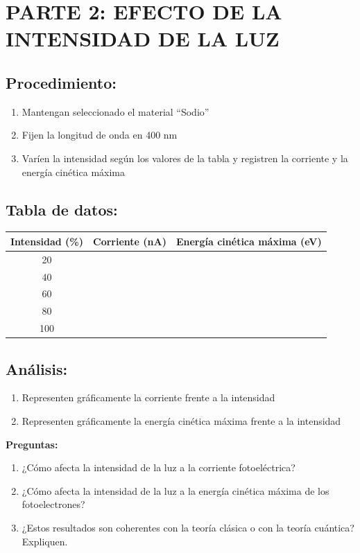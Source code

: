 \documentclass[12pt,a4paper]{article}
\begin{document}
	\section{PARTE 2: EFECTO DE LA INTENSIDAD DE LA LUZ}
	
	\subsection{Procedimiento:}
	\begin{enumerate}
		\item Mantengan seleccionado el material ``Sodio''
		\item Fijen la longitud de onda en 400 nm
		\item Varíen la intensidad según los valores de la tabla y registren la corriente y la energía cinética máxima
	\end{enumerate}
	
	\subsection{Tabla de datos:}
	
	\begin{center}
		\begin{tabular}{|c|c|c|}
			\hline
			\textbf{Intensidad (\%)} & \textbf{Corriente (nA)} & \textbf{Energía cinética máxima (eV)} \\
			\hline
			20 & & \\
			\hline
			40 & & \\
			\hline
			60 & & \\
			\hline
			80 & & \\
			\hline
			100 & & \\
			\hline
		\end{tabular}
	\end{center}
	
	\subsection{Análisis:}
	\begin{enumerate}
		\item Representen gráficamente la corriente frente a la intensidad
		\item Representen gráficamente la energía cinética máxima frente a la intensidad
	\end{enumerate}
	
	\begin{preguntabox}
		\textbf{Preguntas:}
		\begin{enumerate}
			\item ¿Cómo afecta la intensidad de la luz a la corriente fotoeléctrica?
			\item ¿Cómo afecta la intensidad de la luz a la energía cinética máxima de los fotoelectrones?
			\item ¿Estos resultados son coherentes con la teoría clásica o con la teoría cuántica? Expliquen.
		\end{enumerate}
	\end{preguntabox}
	
\end{document}
